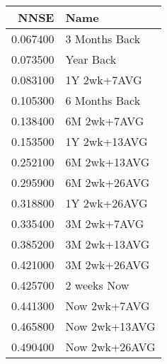\begin{tabular}{rl}
NNSE & Name \\
\hline
0.067400 & 3 Months Back \\
0.073500 & Year Back \\
0.083100 & 1Y 2wk+7AVG \\
0.105300 & 6 Months Back \\
0.138400 & 6M 2wk+7AVG \\
0.153500 & 1Y 2wk+13AVG \\
0.252100 & 6M 2wk+13AVG \\
0.295900 & 6M 2wk+26AVG \\
0.318800 & 1Y 2wk+26AVG \\
0.335400 & 3M 2wk+7AVG \\
0.385200 & 3M 2wk+13AVG \\
0.421000 & 3M 2wk+26AVG \\
0.425700 & 2 weeks Now \\
0.441300 & Now 2wk+7AVG \\
0.465800 & Now 2wk+13AVG \\
0.490400 & Now 2wk+26AVG \\
\hline
\end{tabular}